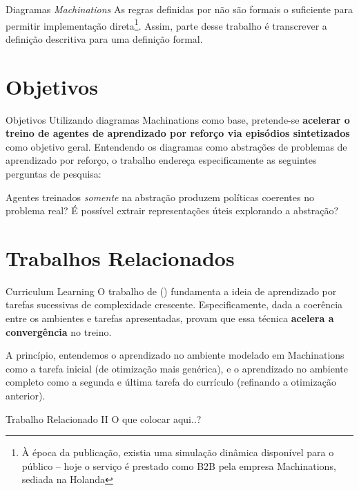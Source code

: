 \documentclass[aspectratio=169]{beamer}
\begin{document}
\begin{frame}{Diagramas \textit{Machinations}}
    As regras definidas por \citeauthor{machinations} não são formais o suficiente para permitir implementação direta\footnote{À época da publicação, existia uma simulação dinâmica disponível para o público -- hoje o serviço é prestado como B2B pela empresa Machinations, sediada na Holanda}. Assim, parte desse trabalho é transcrever a definição descritiva para uma definição formal.
\end{frame}

\section{Objetivos}

\begin{frame}{Objetivos}
    Utilizando diagramas Machinations como base, pretende-se \textbf{acelerar o treino de agentes de aprendizado por reforço via episódios sintetizados} como objetivo geral. Entendendo os diagramas como abstrações de problemas de aprendizado por reforço, o trabalho endereça especificamente as seguintes perguntas de pesquisa:
    \begin{outline}
        \1 Agentes treinados \textit{somente} na abstração produzem políticas coerentes no problema real?
        \1 É possível extrair representações úteis explorando a abstração?
    \end{outline}
\end{frame}

\section{Trabalhos Relacionados}
\begin{frame}{Curriculum Learning}
    O trabalho de \citeauthor{curriculum-learning} (\citeyear{curriculum-learning}) fundamenta a ideia de aprendizado por tarefas sucessivas de complexidade crescente. Especificamente, dada a coerência entre os ambientes e tarefas apresentadas, \citeauthor{curriculum-learning} provam que essa técnica \textbf{acelera a convergência} no treino.

    A princípio, entendemos o aprendizado no ambiente modelado em Machinations como a tarefa inicial (de otimização mais genérica), e o aprendizado no ambiente completo como a segunda e última tarefa do currículo (refinando a otimização anterior).
\end{frame}
\begin{frame}{Trabalho Relacionado II}
    O que colocar aqui..?
\end{frame}
\end{document}
